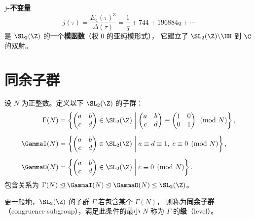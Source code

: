 \begin{example}[$j$-不变量]
\label{ex:j-invariant-function}
\textbf{$j$-不变量}
\[
  j(\tau) = \frac{E_4(\tau)^3}{\Delta(\tau)} = \frac{1}{q} + 744 + 196884q + \cdots
\]
是 $\SL_2(\Z)$ 的一个\textbf{模函数}（权 $0$ 的亚纯模形式），
它建立了 $\SL_2(\Z) \backslash \HH$ 到 $\C$ 的双射。
\end{example}


\section{同余子群}
\label{sec:congruence-subgroups}

\begin{definition}[同余子群]
\label{def:congruence-subgroups}
设 $N$ 为正整数。定义以下 $\SL_2(\Z)$ 的子群：
\begin{align}
  \Gamma(N) &= \left\{
    \begin{pmatrix} a & b \\ c & d \end{pmatrix} \in \SL_2(\Z)
    \;\middle|\;
    \begin{pmatrix} a & b \\ c & d \end{pmatrix}
    \equiv \begin{pmatrix} 1 & 0 \\ 0 & 1 \end{pmatrix} \pmod{N}
  \right\}, \\[6pt]
  \GammaI(N) &= \left\{
    \begin{pmatrix} a & b \\ c & d \end{pmatrix} \in \SL_2(\Z)
    \;\middle|\;
    a \equiv d \equiv 1,\; c \equiv 0 \pmod{N}
  \right\}, \\[6pt]
  \GammaO(N) &= \left\{
    \begin{pmatrix} a & b \\ c & d \end{pmatrix} \in \SL_2(\Z)
    \;\middle|\;
    c \equiv 0 \pmod{N}
  \right\}.
\end{align}
包含关系为 $\Gamma(N) \trianglelefteq \GammaI(N) \trianglelefteq \GammaO(N)
\leq \SL_2(\Z)$。

更一般地，$\SL_2(\Z)$ 的子群 $\Gamma$ 若包含某个 $\Gamma(N)$，
则称为\textbf{同余子群}（congruence subgroup），满足此条件的最小 $N$ 称为
$\Gamma$ 的\textbf{级}（level）。
\end{definition}


